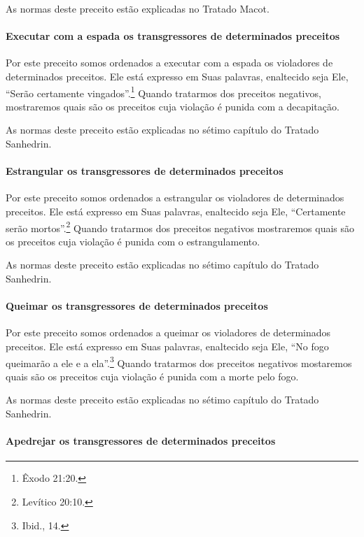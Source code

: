 \begin{multicols}{2}
As normas deste preceito estão explicadas no Tratado Macot\starr.

\paragraph{Executar com a espada os transgressores de determinados preceitos}

Por este preceito somos ordenados a executar com a espada os violadores
de determinados preceitos. Ele está expresso em Suas palavras,
enaltecido seja Ele, ``Serão certamente vingados''.\footnote{Êxodo 21:20.}
Quando tratarmos dos preceitos negativos, mostraremos quais são os
preceitos cuja violação é punida com a decapitação.

As normas deste preceito estão explicadas no sétimo capítulo do Tratado
Sanhedrin\starr.

\paragraph{Estrangular os transgressores de determinados preceitos}

Por este preceito somos ordenados a estrangular os violadores de
determinados preceitos. Ele está expresso em Suas palavras, enaltecido
seja Ele, ``Certamente serão mortos''.\footnote{Levítico 20:10.} Quando tratarmos
dos preceitos negativos mostraremos quais são os preceitos cuja violação
é punida com o estrangulamento.

As normas deste preceito estão explicadas no sétimo capítulo do Tratado
Sanhedrin\starr.

\paragraph{Queimar os transgressores de determinados preceitos}

Por este preceito somos ordenados a queimar os violadores de
determinados preceitos. Ele está expresso em Suas palavras, enaltecido
seja Ele, ``No fogo queimarão a ele e a ela''.\footnote{Ibid., 14.} Quando
tratarmos dos preceitos negativos mostaremos quais são os preceitos
cuja violação é punida com a morte pelo fogo.

As normas deste preceito estão explicadas no sétimo capítulo do Tratado
Sanhedrin\starr.

\paragraph{Apedrejar os transgressores de determinados preceitos}


\end{multicols}
